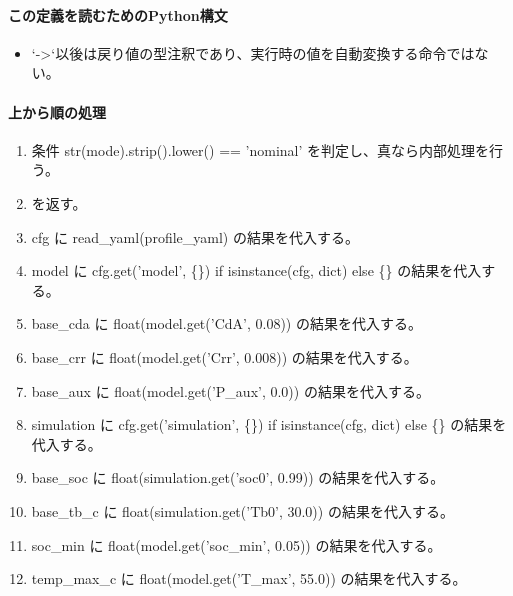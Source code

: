 \documentclass[a4paper,11pt]{article}
\begin{document}
            \paragraph{この定義を読むためのPython構文}
            \begin{itemize}[leftmargin=1.6em]
            \item `->`以後は戻り値の型注釈であり、実行時の値を自動変換する命令ではない。
            \end{itemize}
            \paragraph{上から順の処理}
            \begin{enumerate}[leftmargin=1.8em]
            \item 条件 str(mode).strip().lower() == 'nominal' を判定し、真なら内部処理を行う。
\item   [ScenarioSpec('nominal', cfg\_overrides=\{\}, cli\_overrides=\{\}, weight=1.0)] を返す。
\item cfg に read\_yaml(profile\_yaml) の結果を代入する。
\item model に cfg.get('model', \{\}) if isinstance(cfg, dict) else \{\} の結果を代入する。
\item base\_cda に float(model.get('CdA', 0.08)) の結果を代入する。
\item base\_crr に float(model.get('Crr', 0.008)) の結果を代入する。
\item base\_aux に float(model.get('P\_aux', 0.0)) の結果を代入する。
\item simulation に cfg.get('simulation', \{\}) if isinstance(cfg, dict) else \{\} の結果を代入する。
\item base\_soc に float(simulation.get('soc0', 0.99)) の結果を代入する。
\item base\_tb\_c に float(simulation.get('Tb0', 30.0)) の結果を代入する。
\item soc\_min に float(model.get('soc\_min', 0.05)) の結果を代入する。
\item temp\_max\_c に float(model.get('T\_max', 55.0)) の結果を代入する。

\end{enumerate}
\end{document}
